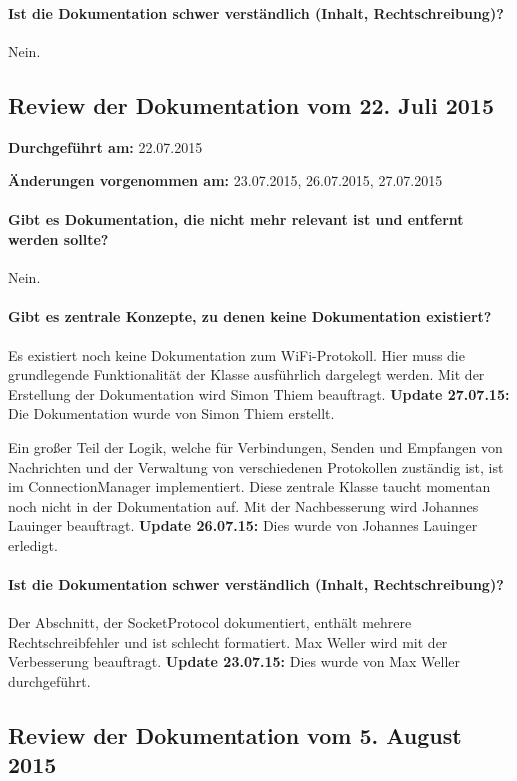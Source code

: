 \paragraph{Ist die Dokumentation schwer verständlich (Inhalt, Rechtschreibung)?}
Nein.


\subsection{Review der Dokumentation vom 22. Juli 2015}

\textbf{Durchgeführt am:} 22.07.2015

\textbf{Änderungen vorgenommen am:} 23.07.2015, 26.07.2015, 27.07.2015

\paragraph{Gibt es Dokumentation, die nicht mehr relevant ist und entfernt werden sollte?}
Nein.

\paragraph{Gibt es zentrale Konzepte, zu denen keine Dokumentation existiert?}
Es existiert noch keine Dokumentation zum WiFi-Protokoll. Hier muss die grundlegende Funktionalität der Klasse ausführlich dargelegt werden. Mit der Erstellung der Dokumentation wird Simon Thiem beauftragt. \textbf{Update 27.07.15:} Die Dokumentation wurde von Simon Thiem erstellt.

Ein großer Teil der Logik, welche für Verbindungen, Senden und Empfangen von Nachrichten und der Verwaltung von verschiedenen Protokollen zuständig ist, ist im ConnectionManager implementiert. Diese zentrale Klasse taucht momentan noch nicht in der Dokumentation auf. Mit der Nachbesserung wird Johannes Lauinger beauftragt. \textbf{Update 26.07.15:} Dies wurde von Johannes Lauinger erledigt.

\paragraph{Ist die Dokumentation schwer verständlich (Inhalt, Rechtschreibung)?}
Der Abschnitt, der SocketProtocol dokumentiert, enthält mehrere Rechtschreibfehler und ist schlecht formatiert. Max Weller wird mit der Verbesserung beauftragt. \textbf{Update 23.07.15:} Dies wurde von Max Weller durchgeführt.


\subsection{Review der Dokumentation vom 5. August 2015}

